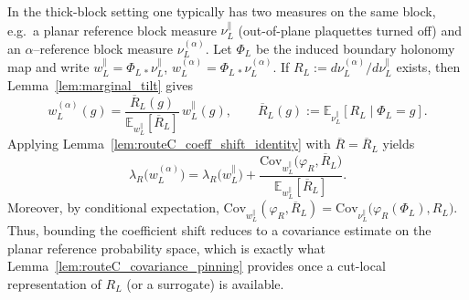 \begin{remark}
In the thick-block setting one typically has two measures on the same block, e.g.\ a planar reference block measure $\nu_L^{\parallel}$
(out-of-plane plaquettes turned off) and an $\alpha$--reference block measure $\nu_L^{(\alpha)}$.
Let $\Phi_L$ be the induced boundary holonomy map and write $w_L^{\parallel}=\Phi_{L\,*}\nu_L^{\parallel}$,
$w_L^{(\alpha)}=\Phi_{L\,*}\nu_L^{(\alpha)}$.
If $R_L:=d\nu_L^{(\alpha)}/d\nu_L^{\parallel}$ exists, then Lemma~\ref{lem:marginal_tilt} gives
\[
w_L^{(\alpha)}(g)
=\frac{\overline R_L(g)}{\mathbb E_{w_L^{\parallel}}[\overline R_L]}\,w_L^{\parallel}(g),
\qquad \overline R_L(g):=\mathbb E_{\nu_L^{\parallel}}[R_L\mid \Phi_L=g].
\]
Applying Lemma~\ref{lem:routeC_coeff_shift_identity} with $\overline R=\overline R_L$ yields
\[
\lambda_R\bigl(w_L^{(\alpha)}\bigr)
=\lambda_R\bigl(w_L^{\parallel}\bigr)
+\frac{\mathrm{Cov}_{w_L^{\parallel}}\bigl(\varphi_R,\overline R_L\bigr)}{\mathbb E_{w_L^{\parallel}}[\overline R_L]}.
\]
Moreover, by conditional expectation,
$\mathrm{Cov}_{w_L^{\parallel}}(\varphi_R,\overline R_L)=\mathrm{Cov}_{\nu_L^{\parallel}}\bigl(\varphi_R(\Phi_L),R_L\bigr)$.
Thus, bounding the coefficient shift reduces to a covariance estimate on the planar reference probability space,
which is exactly what Lemma~\ref{lem:routeC_covariance_pinning} provides once a cut-local representation of $R_L$ (or a surrogate) is available.
\end{remark}

